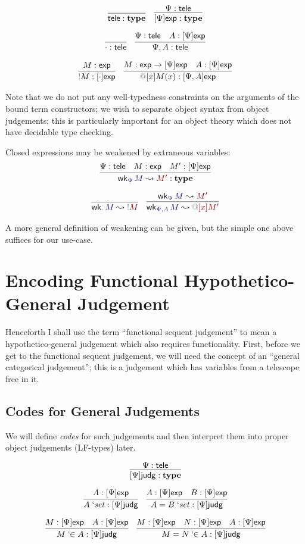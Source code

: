 \documentclass[acmtoplas]{acmtrans2m}
\makeatletter
\def\InputModeColorName{MidnightBlue}
\def\OutputModeColorName{Maroon}
\newcommand\InputMode[1]{{\color{\InputModeColorName}{#1}}}
\newcommand\OutputMode[1]{{\color{\OutputModeColorName}{#1}}}
\newcommand\type{\mathbf{type}}
\newcommand\sortexp{\mathsf{exp}}
\newcommand\sorttele{\mathsf{tele}}
\newcommand\sortoexp[1]{[#1]\sortexp}
\newcommand\sortj{\mathsf{judg}}
\newcommand\sortoj[1]{[#1]\sortj}
\newcommand\nobind[1]{{\color{Gray}!}#1}
\newcommand\bind[2]{{\color{Gray}@}[#1]#2}
\newcommand\weaken[3]{\mathsf{wk}_{\InputMode{#1}}\,\InputMode{#2}\leadsto\OutputMode{#3}}
\newcommand\qisset[1]{#1\;`\mathit{set}}
\newcommand\qeqset[2]{#1=#2\;`\mathit{set}}
\newcommand\qmem[2]{#1\;`\!\!\in#2}
\newcommand\qeqmem[3]{#1=#2\;`\!\!\in#3}
\makeatother
\begin{document}
\begin{gather*}
  \infer{\sorttele:\type}{}
  \quad
  \infer{
    \sortoexp{\Psi}:\type
  }{
    \Psi:\sorttele
  }\\[6pt]
  \infer{\cdot:\sorttele}{}
  \quad
  \infer{
    \Psi,A:\sorttele
  }{
    \Psi:\sorttele &
    A:\sortoexp{\Psi}
  }\\[6pt]
  \infer{
    \nobind{M}:\sortoexp{\cdot}
  }{
    M:\sortexp
  }
  \quad
  \infer{
    \bind{x}{M(x)}:\sortoexp{\Psi,A}
  }{
    M:\sortexp\to\sortoexp\Psi &
    A:\sortoexp\Psi
  }
\end{gather*}

Note that we do not put any well-typedness constraints on the arguments of the
bound term constructors; we wish to separate object syntax from object
judgements; this is particularly important for an object theory which does not
have decidable type checking.

Closed expressions may be weakened by extraneous variables:
\begin{gather*}
  \infer{
    \weaken{\Psi}{M}{M'}:\type
  }{
    \Psi:\sorttele &
    M:\sortexp &
    M':\sortoexp\Psi
  }\\[6pt]
  \infer{
    \weaken{\cdot}{M}{\nobind{M}}
  }{
  }\quad
  \infer{
    \weaken{\Psi,A}{M}{\bind{x}{M'}}
  }{
    \weaken{\Psi}{M}{M'}
  }
\end{gather*}

A more general definition of weakening can be given, but the simple one above
suffices for our use-case.

\section{Encoding Functional Hypothetico-General Judgement}
Henceforth I shall use the term ``functional sequent judgement'' to mean a
hypothetico-general judgement which also requires functionality. First, before
we get to the functional sequent judgement, we will need the concept of an
``general categorical judgement''; this is a judgement which has variables from
a telescope free in it.

\subsection{Codes for General Judgements}
We will define \emph{codes} for such judgements and then
interpret them into proper object judgements (LF-types) later.

\begin{gather*}
  \infer{
    \sortoj\Psi:\type
  }{
    \Psi:\sorttele
  }\\[6pt]
  \infer{
    \qisset{A}:\sortoj\Psi
  }{
    A:\sortoexp\Psi
  }
  \quad
  \infer{
    \qeqset{A}{B}:\sortoj\Psi
  }{
    A:\sortoexp\Psi &
    B:\sortoexp\Psi
  }\\[6pt]
  \infer{
    \qmem{M}{A}:\sortoj\Psi
  }{
    M:\sortoexp\Psi &
    A:\sortoexp\Psi
  }
  \quad
  \infer{
    \qeqmem{M}{N}{A}:\sortoj\Psi
  }{
    M:\sortoexp\Psi &
    N:\sortoexp\Psi &
    A:\sortoexp\Psi
  }
\end{gather*}
\end{document}
